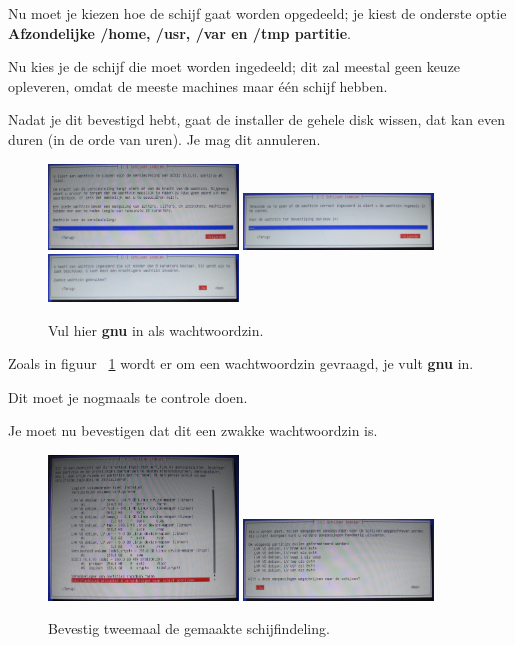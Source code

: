 \documentclass[12pt,a4paper]{article}
\begin{document}
Nu moet je kiezen hoe de schijf gaat worden opgedeeld; je kiest de onderste optie \textbf{Afzondelijke /home, /usr, /var en /tmp partitie}.

Nu kies je de schijf die moet worden ingedeeld; dit zal meestal geen keuze opleveren, omdat de meeste machines maar \'{e}\'{e}n schijf hebben.

Nadat je dit bevestigd hebt, gaat de installer de gehele disk wissen, dat kan even duren (in de orde van uren). Je mag dit annuleren.

\begin{figure}[H]
\centering
\includegraphics[width=0.45\textwidth]{schijven-wachtwoordzin-scherm}
\includegraphics[width=0.45\textwidth]{schijven-wachtwoordzin-bevestiging}
\includegraphics[width=0.45\textwidth]{schijven-zwakke-wachtwoordzin}
\caption{Vul hier \textbf{gnu} in als wachtwoordzin.}
\label{fig:wachtwoordzin-scherm}
\end{figure}

Zoals in figuur ~\ref{fig:wachtwoordzin-scherm} wordt er om een wachtwoordzin gevraagd, je vult \textbf{gnu} in.

Dit moet je nogmaals te controle doen.

Je moet nu bevestigen dat dit een zwakke wachtwoordzin is. 

\begin{figure}[H]
\centering
\includegraphics[width=0.45\textwidth]{schijven-overzicht-scherm}
\includegraphics[width=0.45\textwidth]{schijven-tweede-overzicht-scherm}
\caption{Bevestig tweemaal de gemaakte schijfindeling.}
\label{fig:schijven-overzicht}
\end{figure}
\end{document}
